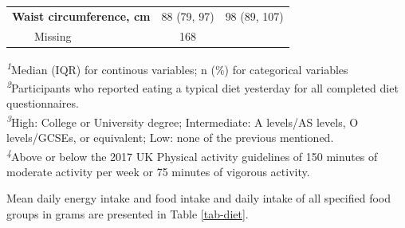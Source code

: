 \documentclass[sn-basic,Numbered,iicol,pdflatex]{sn-jnl}
\begin{document}
\begin{table}[!t]
\begin{tabular*}{1\linewidth}{@{\extracolsep{\fill}}lcc}
{\bfseries Waist circumference, cm} & 88 (79, 97) & 98 (89, 107) \\ 
    Missing & 168 &  \\ 
\bottomrule
\end{tabular*}
\begin{minipage}{\linewidth}
\textsuperscript{\textit{1}}Median (IQR) for continous variables; n (\%) for categorical variables\\
\textsuperscript{\textit{2}}Participants who reported eating a typical diet yesterday for all completed diet questionnaires.\\
\textsuperscript{\textit{3}}High: College or University degree;
Intermediate: A levels/AS levels, O levels/GCSEs, or equivalent;
Low: none of the previous mentioned.\\
\textsuperscript{\textit{4}}Above or below the 2017 UK Physical activity guidelines of 150 minutes of moderate activity per week or 75 minutes of vigorous activity.\\
\end{minipage}
\end{table}

Mean daily energy intake and food intake and daily intake of all
specified food groups in grams are presented in Table \ref{tab-diet}.
\end{document}
